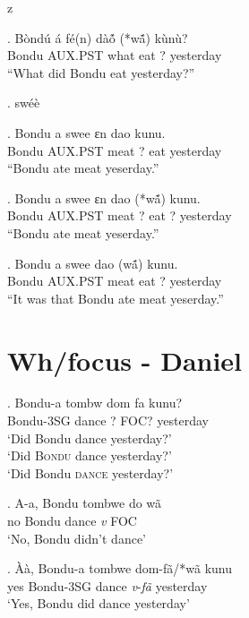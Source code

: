 z   \documentclass{assets/fieldnotes}
\begin{document}
\exg. Bòndú á fé(n) dàó̃ (*wã́) kùnù?\\
Bondu \textsc{AUX.PST} what eat ? yesterday\\
``What did Bondu eat yesterday?''


\ex. swéè

\exg. Bondu a swee ɛn dao kunu.\\
Bondu AUX.PST meat ? eat yesterday\\
``Bondu ate meat yeserday.''

\exg. Bondu a swee ɛn dao (*wã́) kunu.\\
Bondu AUX.PST meat ? eat ? yesterday\\
``Bondu ate meat yeserday.''

\exg. Bondu a swee dao (wã́) kunu.\\
Bondu AUX.PST meat  eat ? yesterday\\
``It was that Bondu ate meat yeserday.''



\section{Wh/focus - Daniel}



\exg. Bondu-a tombw dom fa kunu?\\
Bondu-3SG dance ? FOC? yesterday\\
`Did Bondu dance yesterday?'\\
`Did \textsc{Bondu} dance yesterday?'\\
`Did Bondu \textsc{dance} yesterday?'\\

\exg. A-a, Bondu tombwe do wã\\
no Bondu dance \textit{v} FOC\\
`No, Bondu didn't dance'

\exg. Àà, Bondu-a tombwe dom-fã/*wã kunu\\
yes Bondu-3SG dance \textit{v}-\textit{fã} yesterday\\
`Yes, Bondu did dance yesterday'
\end{document}
